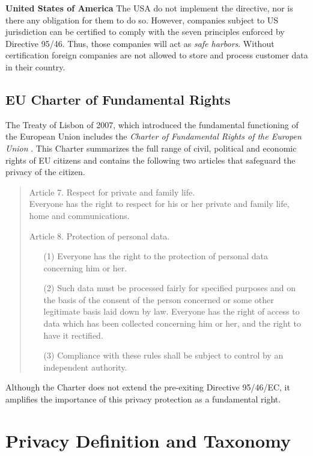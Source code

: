 \textbf{United States of America}
The USA do not implement the directive, nor is there any obligation for them to do so.
However, companies subject to US jurisdiction can be certified to comply with the seven principles enforced by Directive 95/46.
Thus, those companies will act as \emph{safe harbors}.
Without certification foreign companies are not allowed to store and process customer data in their country.


\subsection{EU Charter of Fundamental Rights}
The Treaty of Lisbon of 2007, which introduced the fundamental functioning of the European Union
includes the \emph{Charter of Fundamental Rights of the Europen Union} \cite{EUFR2010}.
This Charter summarizes the full range of civil, political and economic rights of EU citizens and contains the following two articles that safeguard the privacy of the citizen.

\begin{quote}
  Article 7. Respect for private and family life.\\
  Everyone has the right to respect for his or her private and family life, home and communications.

  Article 8. Protection of personal data.
  \begin{enumerate}
    \item [(1)] Everyone has the right to the protection of personal data concerning him or her.
    \item [(2)] Such data must be processed fairly for specified purposes and on the basis of the consent of the person concerned or some other legitimate basis laid down by law.
      Everyone has the right of access to data which has been collected concerning him or her, and the right to have it rectified.
    \item [(3)] Compliance with these rules shall be subject to control by an independent authority.
  \end{enumerate}
\end{quote}

Although the Charter does not extend the pre-exiting Directive 95/46/EC, it amplifies the importance of this privacy protection as a fundamental right.

\section{Privacy Definition and Taxonomy}
\label{sec:taxonomy}

